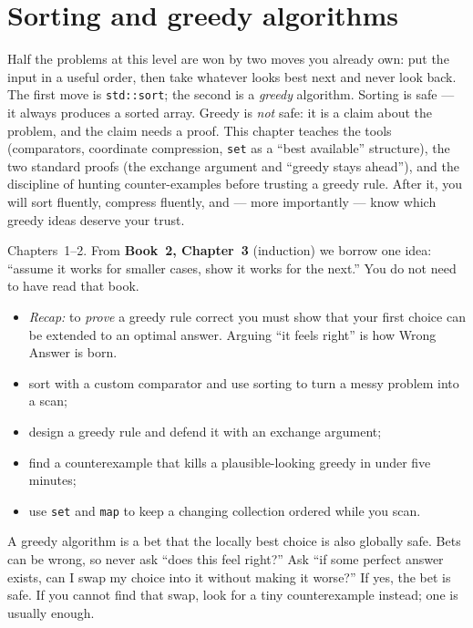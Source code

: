\chapter{Sorting and greedy algorithms}
\label{ch:greedy}

Half the problems at this level are won by two moves you already own: put
the input in a useful order, then take whatever looks best next and never
look back. The first move is \texttt{std::sort}; the second is a
\emph{greedy} algorithm. Sorting is safe --- it always produces a sorted
array. Greedy is \emph{not} safe: it is a claim about the problem, and the
claim needs a proof. This chapter teaches the tools (comparators,
coordinate compression, \texttt{set} as a ``best available'' structure),
the two standard proofs (the exchange argument and ``greedy stays
ahead''), and the discipline of hunting counter-examples before trusting
a greedy rule. After it, you will sort fluently, compress fluently, and
--- more importantly --- know which greedy ideas deserve your trust.

\begin{rulebox}
Chapters~1--2. From \textbf{Book~2, Chapter~3} (induction) we borrow one idea: ``assume it works for smaller cases, show it works for the next.'' You do not need to have read that book.
\begin{itemize}
\item \emph{Recap:} to \emph{prove} a greedy rule correct you must show that your first choice can be extended to an optimal answer. Arguing ``it feels right'' is how Wrong Answer is born.
\end{itemize}
\end{rulebox}
\begin{wins}
\begin{itemize}
\item sort with a custom comparator and use sorting to turn a messy problem into a scan;
\item design a greedy rule and defend it with an exchange argument;
\item find a counterexample that kills a plausible-looking greedy in under five minutes;
\item use \texttt{set} and \texttt{map} to keep a changing collection ordered while you scan.
\end{itemize}
\end{wins}
\begin{principle}
A greedy algorithm is a bet that the locally best choice is also globally safe. Bets can be wrong, so never ask ``does this feel right?'' Ask ``if some perfect answer exists, can I swap my choice into it without making it worse?'' If yes, the bet is safe. If you cannot find that swap, look for a tiny counterexample instead; one is usually enough.
\end{principle}

